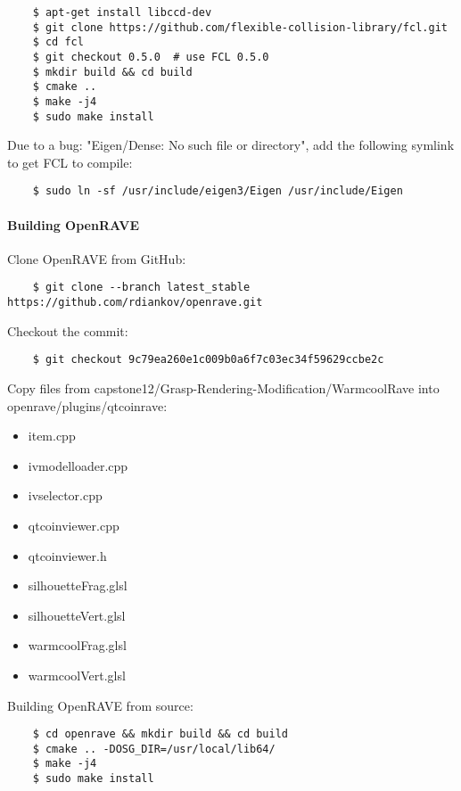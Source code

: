 \begin{lstlisting}
    $ apt-get install libccd-dev
    $ git clone https://github.com/flexible-collision-library/fcl.git
    $ cd fcl
    $ git checkout 0.5.0  # use FCL 0.5.0
    $ mkdir build && cd build
    $ cmake ..
    $ make -j4
    $ sudo make install
\end{lstlisting}

Due to a bug: "Eigen/Dense: No such file or directory", add the following symlink to get FCL to compile:
\begin{lstlisting}
    $ sudo ln -sf /usr/include/eigen3/Eigen /usr/include/Eigen
\end{lstlisting}

\paragraph{Building OpenRAVE}

Clone OpenRAVE from GitHub:

\begin{lstlisting}
    $ git clone --branch latest_stable https://github.com/rdiankov/openrave.git
\end{lstlisting}

Checkout the commit:
\begin{lstlisting}
    $ git checkout 9c79ea260e1c009b0a6f7c03ec34f59629ccbe2c
\end{lstlisting}

{
Copy files from capstone12/Grasp-Rendering-Modification/WarmcoolRave into openrave/plugins/qtcoinrave:
\begin{itemize}
  \item item.cpp
  \item ivmodelloader.cpp
  \item ivselector.cpp
  \item qtcoinviewer.cpp
  \item qtcoinviewer.h
  \item silhouetteFrag.glsl
  \item silhouetteVert.glsl
  \item warmcoolFrag.glsl
  \item warmcoolVert.glsl
\end{itemize}

}

Building OpenRAVE from source:
\begin{lstlisting}
    $ cd openrave && mkdir build && cd build
    $ cmake .. -DOSG_DIR=/usr/local/lib64/
    $ make -j4
    $ sudo make install
\end{lstlisting}

